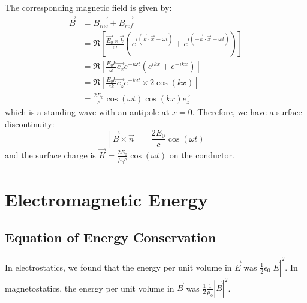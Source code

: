\documentclass[../Main.tex]{subfiles}
\begin{document}
The corresponding magnetic field is given by:
\begin{align*}
    \vec{B}&=\vec{B_{inc}} + \vec{B_{ref}} \\
    &= \Re\left[\frac{\vec{E_0} \times \vec{k}}{\omega}\left(e^{i(\vec{k} \cdot \vec{x} - \omega t)} + e^{i(-\vec{k} \cdot \vec{x} - \omega t)}\right)\right] \\
    &= \Re\left[\frac{E_0 k}{\omega} \vec{e_z}e^{-i\omega t}\left(e^{ikx} + e^{-ikx}\right)\right] \\
    &= \Re\left[\frac{E_0 k}{ck} \vec{e_z}e^{-i\omega t} \times 2\cos(kx)\right] \\
    &= \frac{2E_0}{c} \cos(\omega t) \cos(kx) \vec{e_z}
\end{align*}
which is a standing wave with an antipole at $x = 0$. Therefore, we have a surface discontinuity:
\begin{equation*}
    \left[\vec{B} \times \vec{n}\right] = \frac{2E_0}{c} \cos(\omega t)
\end{equation*}
and the surface charge is $\vec{K} = \frac{2E_0}{\mu_0 c} \cos(\omega t)$ on the conductor.
\section{Electromagnetic Energy}
\subsection{Equation of Energy Conservation}
In electrostatics, we found that the energy per unit volume in $\vec{E}$ was $\frac12 \epsilon_0 |\vec{E}|^2$. In magnetostatics, the energy per unit volume in $\vec{B}$ was $\frac12 \frac{1}{\mu_0} |\vec{B}|^2$.
\end{document}
